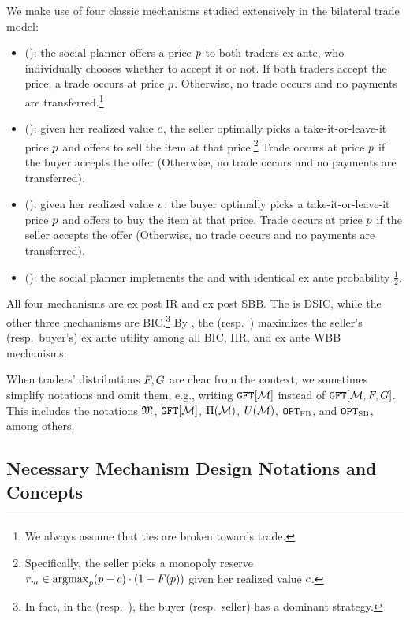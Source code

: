 We make use of four classic mechanisms studied extensively in the bilateral trade model:
\begin{itemize}
    \item {\FixPrice} ({\FPM}): the social planner offers a price $p$ to both traders ex ante, who individually chooses whether to accept it or not. If both traders accept the price, a trade occurs at price $p$. Otherwise, no trade occurs and no payments are transferred.\footnote{{We always assume that ties are broken towards trade.}}
     \item {\SellerOffer} ({\SOM}): given her realized value $c$, the seller optimally picks a take-it-or-leave-it price $p$ and offers to sell the item at that price.\footnote{Specifically, the seller picks a monopoly reserve $r_m \in\operatorname{argmax}_{p}(p -c)\cdot (1 - F(p))$ given her realized value $c$.} Trade occurs at price $p$ if the buyer accepts the offer (Otherwise, no trade occurs and no payments are transferred).
    \item {\BuyerOffer} ({\BOM}): given her realized value $v$, the buyer optimally picks a take-it-or-leave-it price $p$ and offers to buy the item at that price. Trade occurs at price $p$ if the seller accepts the offer (Otherwise, no trade occurs and no payments are transferred).
    \item {\RandomOffer} ({\ROM}): 
    the social planner implements the {\RandomOffer} and {\BuyerOffer} with identical ex ante probability $\frac{1}{2}$.
\end{itemize}
All four mechanisms are ex post IR and ex post SBB. The {\FixPrice} is DSIC, while the other three mechanisms are BIC.\footnote{In fact, 
in the {\SellerOffer} (resp.\ {\BuyerOffer}), the buyer (resp.\ seller) has a dominant strategy.} By \citet{mye-81}, the {\SellerOffer} (resp.\ {\BuyerOffer}) maximizes the seller's (resp.\ buyer's) ex ante utility among all BIC, IIR, and ex ante WBB mechanisms.


When traders' distributions $F,G$ are clear from the context, we sometimes simplify notations and omit them, e.g., writing $\GFT{\mech}$ instead of $\GFT{\mech,\buyerdist,\sellerdist}$. This includes the notations $\mathfrak{M}$, $\GFT{\mech}$, $\Pi(\mathcal{M})$, $U(\mathcal{M})$, $\texttt{OPT}_{\textsc{FB}}$, and $\texttt{OPT}_{\textsc{SB}}$, among others.


\subsection{Necessary Mechanism Design Notations and Concepts}

